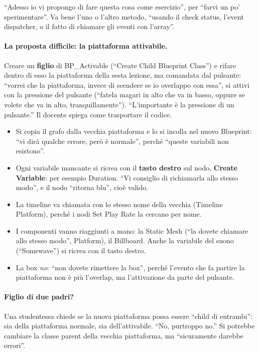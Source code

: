 ``Adesso io vi propongo di fare questa cosa come esercizio'', per ``farvi un po'
sperimentare''. Va bene l'uno o l'altro metodo, ``usando il check status, l'event
dispatcher, o il fatto di chiamare gli eventi con l'array''.

\paragraph{La proposta difficile: la piattaforma attivabile.} Creare un \textbf{figlio} di
BP\_Activable (``Create Child Blueprint Class'') e rifare dentro di esso la piattaforma
della sesta lezione, ma comandata dal pulsante: ``vorrei che la piattaforma, invece di
scendere se io overlappo con essa'', si attivi con la pressione del pulsante (``fatela
magari in alto che va in basso, oppure se volete che va in alto, tranquillamente'').
``L'importante è la pressione di un pulsante.'' Il docente spiega come trasportare il
codice.
\begin{itemize}
  \item Si copia il grafo dalla vecchia piattaforma e lo si incolla nel nuovo Blueprint:
        ``vi dirà qualche errore, però è normale'', perché ``queste variabili non
        esistono''.
  \item Ogni variabile mancante si ricrea con il \textbf{tasto destro} sul nodo,
        \textbf{Create Variable}: per esempio Duration. ``Vi consiglio di richiamarla allo
        stesso modo'', e il nodo ``ritorna blu'', cioè valido.
  \item La timeline va chiamata con lo stesso nome della vecchia (Timeline Platform),
        perché i nodi Set Play Rate la cercano per nome.
  \item I componenti vanno riaggiunti a mano: la Static Mesh (``la dovete chiamare allo
        stesso modo'', Platform), il Billboard. Anche la variabile del suono
        (``Somewave'') si ricrea con il tasto destro.
  \item La box \emph{no}: ``non dovete rimettere la box'', perché l'evento che fa partire
        la piattaforma non è più l'overlap, ma l'attivazione da parte del pulsante.
\end{itemize}

\paragraph{Figlio di due padri?} Una studentessa chiede se la nuova piattaforma possa essere ``child di entrambi'':
sia della piattaforma normale, sia dell'attivabile. ``No, purtroppo no.'' Si potrebbe cambiare la
classe parent della vecchia piattaforma, ma ``sicuramente darebbe errori''.

